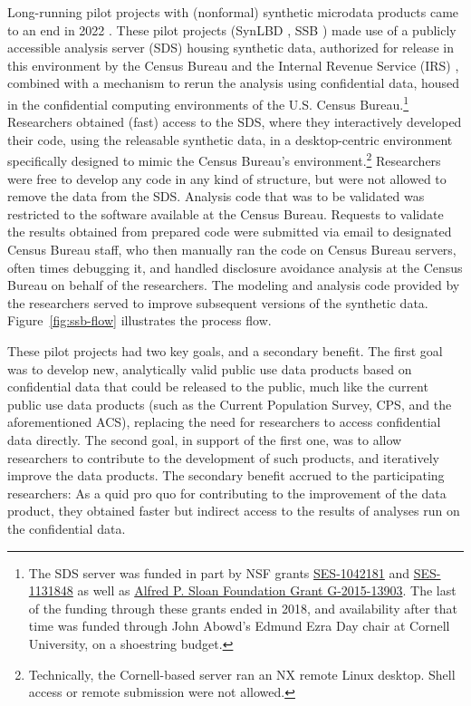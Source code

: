 \documentclass[inline]{hdsr}
\begin{document}
Long-running pilot projects with (nonformal) synthetic microdata products came to an end in 2022 \citep{vilhuber_end_2022}. These pilot projects (SynLBD \citep{KinneyEtAl2011,us_census_bureau_synthetic_2011,vilhuber_codebook_2013}, \ac{SSB} \citep{Benedettoetal_2013,us_census_bureau_sipp_2015,reeder_codebook_2018})   made use of a publicly accessible analysis server  (\acf{SDS}) housing synthetic data, authorized for release in this environment by the Census Bureau and the Internal Revenue Service (IRS) \citep[e.g.][]{us_census_bureau_disclosure_2015}, combined with a mechanism to rerun the analysis using confidential data, housed in the confidential computing environments of the U.S. Census Bureau.\footnote{The \ac{SDS} server was funded in part by NSF grants \href{http://www.nsf.gov/awardsearch/showAward.do?AwardNumber=1042181}{SES-1042181} and \href{http://www.nsf.gov/awardsearch/showAward.do?AwardNumber=1131848}{SES-1131848} as well as \href{https://sloan.org/grant-detail/6845}{Alfred P. Sloan Foundation Grant G-2015-13903}. The last of the funding through these grants ended in 2018, and availability after that time was funded through John Abowd's Edmund Ezra Day chair at Cornell University, on a shoestring budget.} Researchers obtained (fast) access to the \ac{SDS}, where they interactively developed their code, using the releasable synthetic data, in a desktop-centric environment specifically designed to mimic the Census Bureau's environment.\footnote{Technically, the Cornell-based server ran an NX remote Linux desktop. Shell access or remote submission were not allowed.} Researchers were free to develop any code in any kind of structure, but were not allowed to remove the data from the \ac{SDS}. Analysis code that was to be validated was restricted to the software available at the Census Bureau. Requests to validate the results obtained from prepared code were submitted via email to designated Census Bureau staff, who then manually ran the code on Census Bureau servers, often times debugging it, and handled disclosure avoidance analysis at the Census Bureau on behalf of the researchers. The modeling and analysis code provided by the researchers served to improve subsequent versions of the synthetic data. Figure~\ref{fig:ssb-flow} illustrates the process flow.

These pilot projects had two key goals, and a secondary benefit. The first goal was to develop new, analytically valid public use data products based on confidential data that could be released to the public, much like the current public use data products (such as the Current Population Survey, CPS, and the aforementioned \ac{ACS}), replacing the need for researchers to access confidential data directly. The second goal, in support of the first one, was to allow researchers to contribute to the development of such products, and iteratively improve the data products. The secondary benefit accrued to the participating researchers: As a quid pro quo for contributing to the improvement of the data product, they obtained faster but indirect access to the results of analyses run on the confidential data. 
\end{document}
